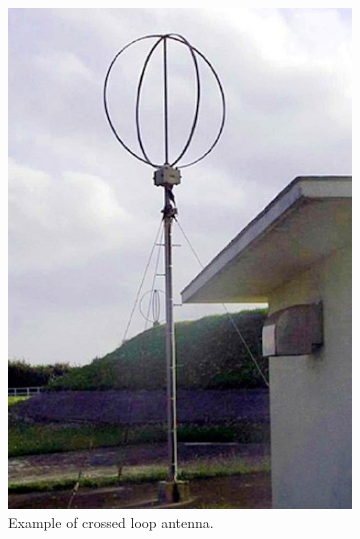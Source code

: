 \begin{figure}
  \centering
  \begin{subfigure}[b]{0.3\textwidth}
    \includegraphics[width=\textwidth]{./img/lit_review/loop_antenna_crossed}
    \caption{Example of crossed loop antenna.}
  \end{subfigure}
  ~
  \begin{subfigure}[b]{0.4\textwidth}

\end{subfigure}
\end{figure}
